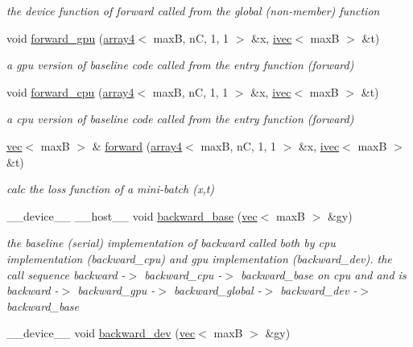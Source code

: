 \begin{DoxyCompactItemize}
\begin{DoxyCompactList}\small\item\em the device function of forward called from the global (non-\/member) function \end{DoxyCompactList}\item 
void \hyperlink{structSoftmaxCrossEntropy_a0e71f6ceb53d769e6b4d7a6d83034669}{forward\+\_\+gpu} (\hyperlink{structarray4}{array4}$<$ maxB, nC, 1, 1 $>$ \&x, \hyperlink{structivec}{ivec}$<$ maxB $>$ \&t)
\begin{DoxyCompactList}\small\item\em a gpu version of baseline code called from the entry function (forward) \end{DoxyCompactList}\item 
void \hyperlink{structSoftmaxCrossEntropy_a3e4f2e0a025eaf98fa9f614dd355bdf7}{forward\+\_\+cpu} (\hyperlink{structarray4}{array4}$<$ maxB, nC, 1, 1 $>$ \&x, \hyperlink{structivec}{ivec}$<$ maxB $>$ \&t)
\begin{DoxyCompactList}\small\item\em a cpu version of baseline code called from the entry function (forward) \end{DoxyCompactList}\item 
\hyperlink{structvec}{vec}$<$ maxB $>$ \& \hyperlink{structSoftmaxCrossEntropy_ad9123a2a40bac45237466faf0cff3fbc}{forward} (\hyperlink{structarray4}{array4}$<$ maxB, nC, 1, 1 $>$ \&x, \hyperlink{structivec}{ivec}$<$ maxB $>$ \&t)
\begin{DoxyCompactList}\small\item\em calc the loss function of a mini-\/batch (x,t) \end{DoxyCompactList}\item 
\+\_\+\+\_\+device\+\_\+\+\_\+ \+\_\+\+\_\+host\+\_\+\+\_\+ void \hyperlink{structSoftmaxCrossEntropy_a1cea37bcbeedb5749f56f740baa6ce92}{backward\+\_\+base} (\hyperlink{structvec}{vec}$<$ maxB $>$ \&gy)
\begin{DoxyCompactList}\small\item\em the baseline (serial) implementation of backward called both by cpu implementation (backward\+\_\+cpu) and gpu implementation (backward\+\_\+dev). the call sequence backward -\/$>$ backward\+\_\+cpu -\/$>$ backward\+\_\+base on cpu and and is backward -\/$>$ backward\+\_\+gpu -\/$>$ backward\+\_\+global -\/$>$ backward\+\_\+dev -\/$>$ backward\+\_\+base \end{DoxyCompactList}\item 
\+\_\+\+\_\+device\+\_\+\+\_\+ void \hyperlink{structSoftmaxCrossEntropy_ad7560f49148405e09d5a9a0a6ee0ee92}{backward\+\_\+dev} (\hyperlink{structvec}{vec}$<$ maxB $>$ \&gy)

\end{DoxyCompactItemize}
